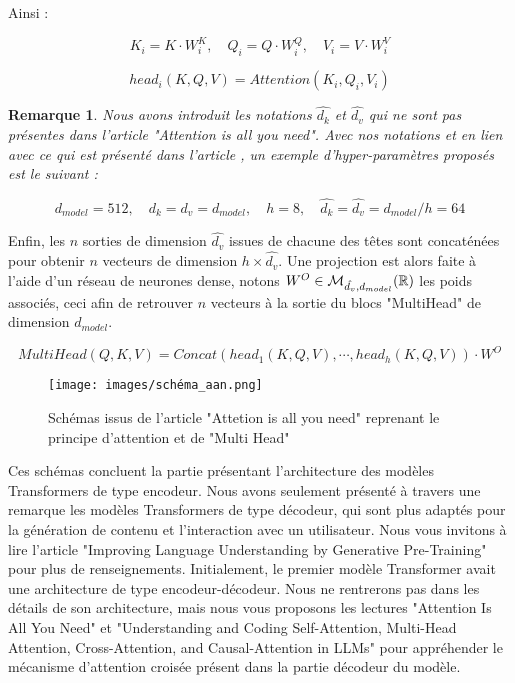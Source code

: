 \documentclass[12pt]{article}
\newtheorem{rmq}{Remarque}
\theoremstyle{definition}
\begin{document}
Ainsi : 

$$K_i = K\cdot W_i^K ,\quad  Q_i = Q\cdot W_i^Q ,\quad  V_i = V \cdot W_i^V $$

$$head_i(K,Q,V) = Attention(K_i,Q_i,V_i) $$

\newpage 
\begin{rmq}
	Nous avons introduit les notations $\hat{d_k}$ et  $\hat{d_v}$ qui ne sont pas présentes dans l'article "Attention is all you need". Avec nos notations et en lien avec ce qui est présenté dans l'article \cite{a_i_a_y_n}, un exemple d'hyper-paramètres proposés est le suivant : 
	
	$$d_{model} = 512, \quad d_k= d_v= d_{model}, \quad h=8, \quad \hat{d_k} = \hat{d_v} = d_{model}/h = 64  $$
\end{rmq}

Enfin, les $n$ sorties de dimension $\hat{d_v}$ issues de chacune des têtes sont concaténées pour obtenir $n$ vecteurs de dimension $h\times\hat{d_v}$. Une projection est alors faite à l'aide d'un réseau de neurones dense, notons $W^O\in\mathcal{M}_{\hat{d_v},d_{model} }(\mathbb{R})$ les poids associés, ceci afin de retrouver $n$ vecteurs à la sortie du blocs "MultiHead" de dimension $d_{model}$.

$$MultiHead(Q,K,V) = Concat(head_1(K,Q,V), \cdots , head_h(K,Q,V)) \cdot W^O$$ 

\begin{figure*}[!h]
	\centering
	\texttt{[image: images/schéma\_aan.png]}
	\caption{Schémas issus de l'article "Attetion is all you need" \cite{a_i_a_y_n} reprenant le principe d'attention et de "Multi Head"}
\end{figure*}

Ces schémas concluent la partie présentant l'architecture des modèles Transformers de type encodeur. Nous avons seulement présenté à travers une remarque les modèles Transformers de type décodeur, qui sont plus adaptés pour la génération de contenu et l'interaction avec un utilisateur. Nous vous invitons à lire l'article "Improving Language Understanding by Generative Pre-Training" \cite{openai_gpt} pour plus de renseignements. Initialement, le premier modèle Transformer avait une architecture de type encodeur-décodeur. Nous ne rentrerons pas dans les détails de son architecture, mais nous vous proposons les lectures "Attention Is All You Need" \cite{a_i_a_y_n} et "Understanding and Coding Self-Attention, Multi-Head Attention, Cross-Attention, and Causal-Attention in LLMs" \cite{und_code_sa} pour appréhender le mécanisme d'attention croisée présent dans la partie décodeur du modèle.
\end{document}
